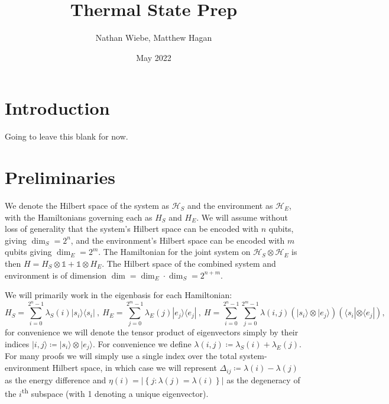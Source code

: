 \documentclass{article}
\title{Thermal State Prep}
\author{Nathan Wiebe, Matthew Hagan}
\date{May 2022}
\newcommand{\ket}[1]{|#1\rangle}
\newcommand{\bra}[1]{\langle #1|}
\newcommand{\ketbra}[2]{| #1\rangle\! \langle #2|}
\newcommand{\abs}[1]{\left| #1 \right|}
\newcommand{\set}[1]{\left\{ #1 \right\}}
\newcommand{\ts}{\textsuperscript}
\newcommand{\hilb}{\mathcal{H}}
\newcommand{\identity}{\mathds{1}}
\begin{document}
\maketitle

\section{Introduction}
Going to leave this blank for now. \cite{shiraishi_undecidability_2021}

\section{Preliminaries}
We denote the Hilbert space of the system as $\hilb_{S}$ and the environment as $\hilb_{E}$, with the Hamiltonians governing each as $H_{S}$ and $H_{E}$. We will assume without loss of generality that the system's Hilbert space can be encoded with $n$ qubits, giving $\dim_S = 2^{n}$, and the environment's Hilbert space can be encoded with $m$ qubits giving $\dim_E = 2^{m}$. The Hamiltonian for the joint system on $\hilb_{S} \otimes \hilb_{E}$ is then $H = H_{S} \otimes \identity + \identity \otimes H_{E}$. The Hilbert space of the combined system and environment is of dimension $\dim = \dim_E \cdot \dim_S = 2^{n + m}$. 

We will primarily work in the eigenbasis for each Hamiltonian:
\begin{equation}
    H_{S} = \sum_{i = 0}^{2^n - 1} \lambda_S(i) \ketbra{s_i}{s_i} ~,~ H_{E} = \sum_{j=0}^{2^m - 1} \lambda_E(j) \ketbra{e_j}{e_j} ~,~ H = \sum_{i=0}^{2^n - 1} \sum_{j=0}^{2^m - 1} \lambda(i,j) (\ket{s_i} \otimes \ket{e_j})(\bra{s_i} \otimes \bra{e_j}),
\end{equation}
for convenience we will denote the tensor product of eigenvectors simply by their indices $\ket{i,j} \coloneqq \ket{s_i} \otimes \ket{e_j}$. For convenience we define $\lambda(i,j) \coloneqq \lambda_S(i) + \lambda_E(j)$. For many proofs we will simply use a single index over the total system-environment Hilbert space, in which case we will represent $\Delta_{ij} \coloneqq \lambda(i) - \lambda(j)$ as the energy difference and $\eta(i) = \abs{\set{j : \lambda(j) = \lambda(i)}}$ as the degeneracy of the $i$\ts{th} subspace (with 1 denoting a unique eigenvector).
\end{document}

